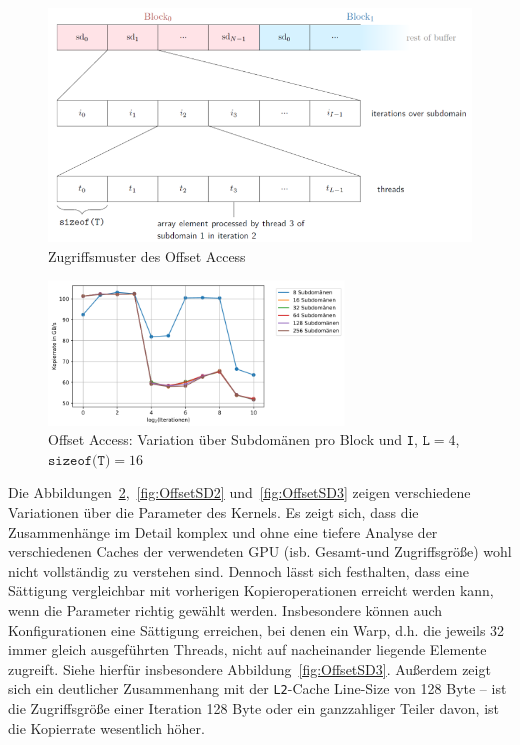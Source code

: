 \documentclass[11pt, abstract=on]{scrartcl}
\begin{document}
\begin{figure} [htbp]
 	\centering
 		\includegraphics[width=1.0\textwidth]{Graph_OffsetAccessZugriff.png}
 	\caption{Zugriffsmuster des Offset Access}
 	\label{fig:OffsetZugriff}
\end{figure}

\begin{figure} [htbp]
 	\centering
 		\includegraphics[width=0.7\textwidth]{Graph_OffsetAccessSDpBlock2.png}
 	\caption{Offset Access: Variation über Subdomänen pro Block und \texttt{I}, $\texttt{L} = 4$, $\texttt{sizeof(T)} = 16$}
 	\label{fig:OffsetSD1}
\end{figure}

Die Abbildungen~\ref{fig:OffsetSD1},~\ref{fig:OffsetSD2} und~\ref{fig:OffsetSD3} zeigen verschiedene Variationen über die Parameter des Kernels. Es zeigt sich, dass die Zusammenhänge im Detail komplex und ohne eine tiefere Analyse der verschiedenen Caches der verwendeten GPU (isb. Gesamt-und Zugriffsgröße) wohl nicht vollständig zu verstehen sind. Dennoch lässt sich festhalten, dass eine Sättigung vergleichbar mit vorherigen Kopieroperationen erreicht werden kann, wenn die Parameter richtig gewählt werden. Insbesondere können auch Konfigurationen eine Sättigung erreichen, bei denen ein Warp, d.h. die jeweils 32 immer gleich ausgeführten Threads, nicht auf nacheinander liegende Elemente zugreift. Siehe hierfür insbesondere Abbildung~\ref{fig:OffsetSD3}. Außerdem zeigt sich ein deutlicher Zusammenhang mit der \texttt{L2}-Cache Line-Size von 128 Byte -- ist die Zugriffsgröße einer Iteration 128 Byte oder ein ganzzahliger Teiler davon, ist die Kopierrate wesentlich höher.
\end{document}
